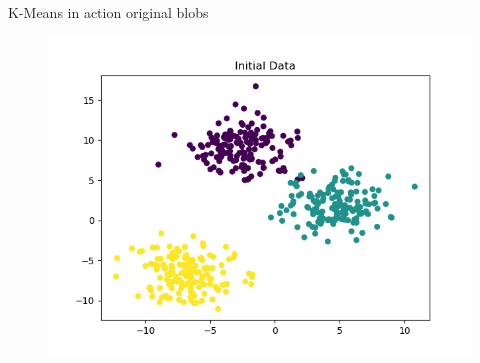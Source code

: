 \documentclass[serif, aspectratio=169]{beamer}
\begin{document}
\begin{frame}{K-Means in action}
original blobs
    \begin{figure}
        \centering
        \includegraphics[scale=0.45]{kmeans_in_action_figures/original.png}
    \end{figure}
\end{frame}
\end{document}
